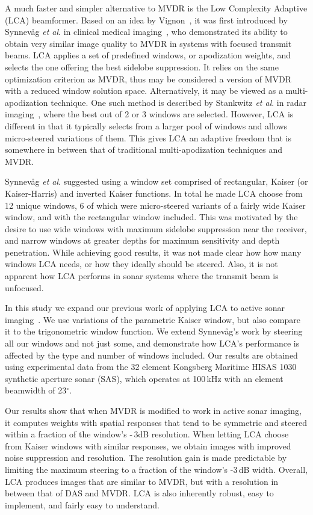 \documentclass[10pt,journal,draftclsnofoot,onecolumn]{IEEEtran}
\newcommand\1{\vec 1}
\begin{document}
A much faster and simpler alternative to MVDR is the Low Complexity Adaptive (LCA) beamformer. Based on an idea by Vignon~\cite{Vignon2008}, it was first introduced by Synnev\aa{}g \emph{et al}. in clinical medical imaging~\cite{Synnevag2008}, who demonstrated its ability to obtain very similar image quality to MVDR in systems with focused transmit beams. LCA applies a set of predefined windows, or apodization weights, and selects the one offering the best sidelobe suppression. It relies on the same optimization criterion as MVDR, thus may be considered a version of MVDR with a reduced window solution space. Alternatively, it may be viewed as a multi-apodization technique. One such method is described by Stankwitz \emph{et al}. in radar imaging~\cite{Stankwitz1995}, where the best out of 2 or 3 windows are selected. However, LCA is different in that it typically selects from a larger pool of windows and allows micro-steered variations of them. This gives LCA an adaptive freedom that is somewhere in between that of traditional multi-apodization techniques and MVDR.

Synnev\aa{}g \emph{et al}. suggested using a window set comprised of rectangular, Kaiser (or Kaiser-Harris) and inverted Kaiser functions. In total he made LCA choose from 12 unique windows, 6 of which were micro-steered variants of a fairly wide Kaiser window, and with the rectangular window included. This was motivated by the desire to use wide windows with maximum sidelobe suppression near the receiver, and narrow windows at greater depths for maximum sensitivity and depth penetration. While achieving good results, it was not made clear how how many windows LCA needs, or how they ideally should be steered. Also, it is not apparent how LCA performs in sonar systems where the transmit beam is unfocused.

In this study we expand our previous work of applying LCA to active sonar imaging~\cite{Buskenes2011}. We use variations of the parametric Kaiser window, but also compare it to the trigonometric window function. We extend Synnev\aa{}g's work by steering all our windows and not just some, and demonstrate how LCA's performance is affected by the type and number of windows included. Our results are obtained using experimental data from the 32 element Kongsberg Maritime HISAS 1030 synthetic aperture sonar (SAS), which operates at 100\,kHz with an element beamwidth of 23$^\circ$. 

Our results show that when MVDR is modified to work in active sonar imaging, it computes weights with spatial responses that tend to be symmetric and steered within a fraction of the window's -\,3dB resolution. When letting LCA choose from Kaiser windows with similar responses, we obtain images with improved noise suppression and resolution. The resolution gain is made predictable by limiting the maximum steering to a fraction of the window's -3\,dB width. Overall, LCA produces images that are similar to MVDR, but with a resolution in between that of DAS and MVDR. LCA is also inherently robust, easy to implement, and fairly easy to understand.
\end{document}
